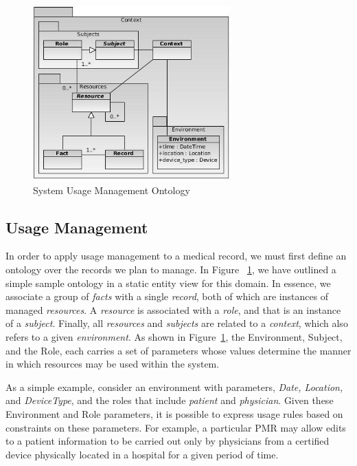 \documentclass[10pt, conference, compsocconf]{IEEEtran}
\begin{document}
\begin{figure}[!t]
\centering
\includegraphics[width=3in]{UMOntology}
\caption{System Usage Management Ontology}
\label{fig:Ontology}
\end{figure}

\subsection{Usage Management}
In order to apply usage management to a medical record, we must first define an ontology over the records we plan to manage.  In Figure ~\ref{fig:Ontology}, we have outlined a simple sample ontology in a static entity view for this domain.  In essence, we associate a group of \textit{facts} with a single \textit{record}, both of which are instances of managed \textit{resources}.  A \textit{resource} is associated with a \textit{role}, and that is an instance of a \textit{subject}.  Finally, all \textit{resources} and \textit{subjects} are related to a \textit{context}, which also refers to a given \textit{environment}. As shown in Figure~\ref{fig:Ontology}, the Environment, Subject, and the Role, each carries a set of parameters whose values determine the manner in which resources may be used within the system. 

As a simple example, consider an environment with parameters, \textit{Date, Location,} and \textit{DeviceType}, and the roles that include \textit{patient}  and \textit{physician}. Given these Environment and Role parameters, it is possible to express usage rules based on constraints on these parameters. For example, a particular PMR may allow edits to a patient information to be carried out only by physicians from a certified device physically located in a hospital for a given period of time. 
\end{document}
